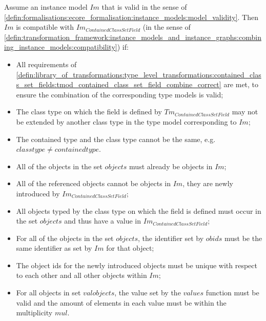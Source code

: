 \begin{thm}
\label{defin:library_of_transformations:instance_level_transformations:contained_class_set_field_values:imod_contained_class_set_field_combine_correct}
Assume an instance model $Im$ that is valid in the sense of \cref{defin:formalisations:ecore_formalisation:instance_models:model_validity}. Then $Im$ is compatible with $Im_{ContainedClassSetField}$ (in the sense of \cref{defin:transformation_framework:instance_models_and_instance_graphs:combining_instance_models:compatibility}) if:
\begin{itemize}
    \item All requirements of \cref{defin:library_of_transformations:type_level_transformations:contained_class_set_fields:tmod_contained_class_set_field_combine_correct} are met, to ensure the combination of the corresponding type models is valid;
    \item The class type on which the field is defined by $Tm_{ContainedClassSetField}$ may not be extended by another class type in the type model corresponding to $Im$;
    \item The contained type and the class type cannot be the same, e.g. $classtype \neq containedtype$.
    \item All of the objects in the set $objects$ must already be objects in $Im$;
    \item All of the referenced objects cannot be objects in $Im$, they are newly introduced by $Im_{ContainedClassSetField}$;
    \item All objects typed by the class type on which the field is defined must occur in the set $objects$ and thus have a value in $Im_{ContainedClassSetField}$;
    \item For all of the objects in the set $objects$, the identifier set by $obids$ must be the same identifier as set by $Im$ for that object;
    \item The object ids for the newly introduced objects must be unique with respect to each other and all other objects within $Im$;
    \item For all objects in set $valobjects$, the value set by the $values$ function must be valid and the amount of elements in each value must be within the multiplicity $mul$.
\end{itemize}
\end{thm}

